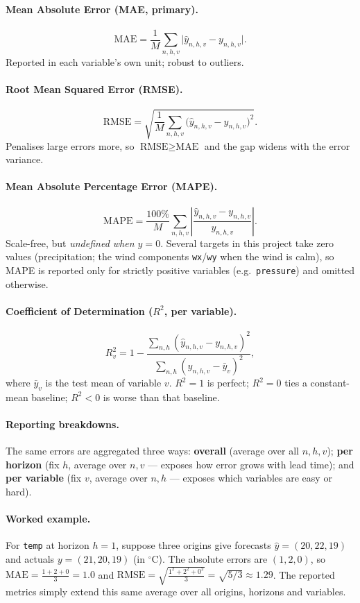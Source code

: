 \documentclass[12pt,a4paper,oneside]{report}
\begin{document}
\paragraph{Mean Absolute Error (MAE, primary).}
\[
  \text{MAE} = \frac{1}{M}\sum_{n,h,v}\big|\hat{y}_{n,h,v}-y_{n,h,v}\big|.
\]
Reported in each variable's own unit; robust to outliers.

\paragraph{Root Mean Squared Error (RMSE).}
\[
  \text{RMSE} = \sqrt{\frac{1}{M}\sum_{n,h,v}\big(\hat{y}_{n,h,v}-y_{n,h,v}\big)^2}.
\]
Penalises large errors more, so $\text{RMSE}\ge\text{MAE}$ and the gap widens with
the error variance.

\paragraph{Mean Absolute Percentage Error (MAPE).}
\[
  \text{MAPE} = \frac{100\%}{M}\sum_{n,h,v}
  \left|\frac{\hat{y}_{n,h,v}-y_{n,h,v}}{y_{n,h,v}}\right|.
\]
Scale-free, but \emph{undefined when $y=0$}. Several targets in this project take
zero values (precipitation; the wind components \texttt{wx}/\texttt{wy} when the
wind is calm), so MAPE is reported only for strictly positive variables (e.g.\
\texttt{pressure}) and omitted otherwise.

\paragraph{Coefficient of Determination ($R^2$, per variable).}
\[
  R^2_v = 1 - \frac{\sum_{n,h}(\hat{y}_{n,h,v}-y_{n,h,v})^2}
                   {\sum_{n,h}(y_{n,h,v}-\bar{y}_v)^2},
\]
where $\bar{y}_v$ is the test mean of variable $v$. $R^2=1$ is perfect; $R^2=0$
ties a constant-mean baseline; $R^2<0$ is worse than that baseline.

\paragraph{Reporting breakdowns.}
The same errors are aggregated three ways: \textbf{overall} (average over all
$n,h,v$); \textbf{per horizon} (fix $h$, average over $n,v$ --- exposes how error
grows with lead time); and \textbf{per variable} (fix $v$, average over $n,h$ ---
exposes which variables are easy or hard).

\paragraph{Worked example.}
For \texttt{temp} at horizon $h{=}1$, suppose three origins give forecasts
$\hat{y}=(20,22,19)$ and actuals $y=(21,20,19)$ (in $^\circ$C). The absolute
errors are $(1,2,0)$, so
$\text{MAE}=\tfrac{1+2+0}{3}=1.0$ and
$\text{RMSE}=\sqrt{\tfrac{1^2+2^2+0^2}{3}}=\sqrt{5/3}\approx 1.29$. The reported
metrics simply extend this same average over all origins, horizons and variables.
\end{document}
